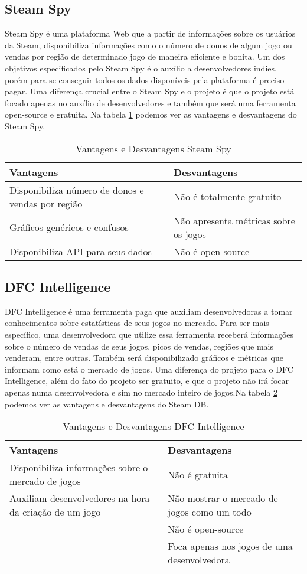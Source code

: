 \subsection{Steam Spy}
Steam Spy é uma plataforma Web que a partir de informações sobre os usuários da Steam, disponibiliza informações como o número de donos de algum jogo ou vendas por região de determinado jogo de maneira eficiente e bonita\cite{steam_spy}. Um dos objetivos especificados pelo Steam Spy é o auxílio a desenvolvedores indies, porém para se conseguir todos os dados disponíveis pela plataforma é preciso pagar. Uma diferença crucial entre o Steam Spy e o projeto é que o projeto está focado apenas no auxílio de desenvolvedores e também que será uma ferramenta open-source e gratuita. Na tabela \ref{table:steam_spy} podemos ver as vantagens e desvantagens do Steam Spy.
\begin{table}
\centering
\begin{tabular}{|p{7cm}|p{7cm}|}
\hline \textbf{Vantagens} & \textbf{Desvantagens} \\
\hline Disponibiliza número de donos e vendas por região & Não é totalmente gratuito \\
\hline Gráficos genéricos e confusos & Não apresenta métricas sobre os jogos \\
\hline Disponibiliza API para seus dados & Não é open-source \\
\hline
\end{tabular}
\caption{Vantagens e Desvantagens Steam Spy}
\label{table:steam_spy}
\end{table}
\subsection{DFC Intelligence}
DFC Intelligence é uma ferramenta paga que auxiliam desenvolvedoras a tomar conhecimentos sobre estatísticas de seus jogos no mercado. Para ser mais específico, uma desenvolvedora que utilize essa ferramenta receberá informações sobre o número de vendas de seus jogos, picos de vendas, regiões que mais venderam, entre outras. Também será disponibilizado gráficos e métricas que informam como está o mercado de jogos\cite{dfc_intelligence}. Uma diferença do projeto para o DFC Intelligence, além do fato do projeto ser gratuito, e que o projeto não irá focar apenas numa desenvolvedora e sim no mercado inteiro de jogos.Na tabela \ref{table:dfc_intelligence} podemos ver as vantagens e desvantagens do Steam DB.
\begin{table}
\centering
\begin{tabular}{|p{7cm}|p{7cm}|}
\hline \textbf{Vantagens} & \textbf{Desvantagens} \\
\hline Disponibiliza informações sobre o mercado de jogos & Não é gratuita \\
\hline Auxiliam desenvolvedores na hora da criação de um jogo & Não mostrar o mercado de jogos como um todo \\
\hline & Não é open-source \\
\hline & Foca apenas nos jogos de uma desenvolvedora \\
\hline
\end{tabular}
\caption{Vantagens e Desvantagens DFC Intelligence}
\label{table:dfc_intelligence}
\end{table}